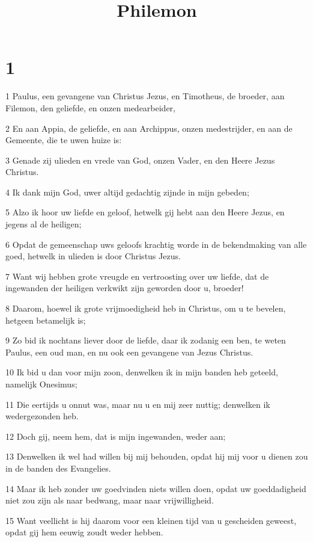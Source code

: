 

\title{Philemon}



\chapter{1}

\par 1 Paulus, een gevangene van Christus Jezus, en Timotheus, de broeder, aan Filemon, den geliefde, en onzen medearbeider,
\par 2 En aan Appia, de geliefde, en aan Archippus, onzen medestrijder, en aan de Gemeente, die te uwen huize is:
\par 3 Genade zij ulieden en vrede van God, onzen Vader, en den Heere Jezus Christus.
\par 4 Ik dank mijn God, uwer altijd gedachtig zijnde in mijn gebeden;
\par 5 Alzo ik hoor uw liefde en geloof, hetwelk gij hebt aan den Heere Jezus, en jegens al de heiligen;
\par 6 Opdat de gemeenschap uws geloofs krachtig worde in de bekendmaking van alle goed, hetwelk in ulieden is door Christus Jezus.
\par 7 Want wij hebben grote vreugde en vertroosting over uw liefde, dat de ingewanden der heiligen verkwikt zijn geworden door u, broeder!
\par 8 Daarom, hoewel ik grote vrijmoedigheid heb in Christus, om u te bevelen, hetgeen betamelijk is;
\par 9 Zo bid ik nochtans liever door de liefde, daar ik zodanig een ben, te weten Paulus, een oud man, en nu ook een gevangene van Jezus Christus.
\par 10 Ik bid u dan voor mijn zoon, denwelken ik in mijn banden heb geteeld, namelijk Onesimus;
\par 11 Die eertijds u onnut was, maar nu u en mij zeer nuttig; denwelken ik wedergezonden heb.
\par 12 Doch gij, neem hem, dat is mijn ingewanden, weder aan;
\par 13 Denwelken ik wel had willen bij mij behouden, opdat hij mij voor u dienen zou in de banden des Evangelies.
\par 14 Maar ik heb zonder uw goedvinden niets willen doen, opdat uw goeddadigheid niet zou zijn als naar bedwang, maar naar vrijwilligheid.
\par 15 Want veellicht is hij daarom voor een kleinen tijd van u gescheiden geweest, opdat gij hem eeuwig zoudt weder hebben.

